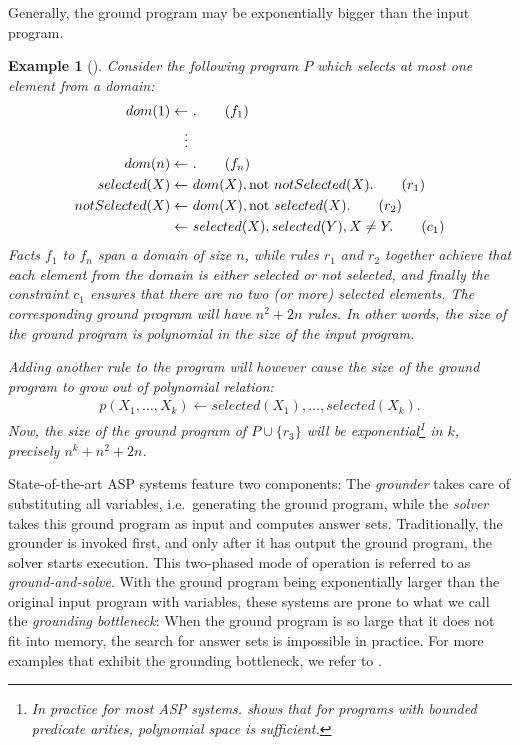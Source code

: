 \documentclass{vutinfth} %
\newtheorem{example}{Example}[chapter]
\newcommand{\fail}{\mathrm{not } \ \xspace}
\newcommand{\from}{\ensuremath{\leftarrow}}
\begin{document}
Generally, the ground program may be exponentially bigger than the input program.

\newpage

\begin{example}[{\cite[Example 1]{alpha-techniques}}]
\label{ex:explosion}
Consider the following program $P$ which selects at most one element from a domain:
\begin{align}
dom(1) \from& \ .\tag{$f_1$} \\
\vdots \notag \\
dom(n) \from& \ . \tag{$f_n$} \\
selected(X) \from& \  dom(X), \fail notSelected(X).  \tag{$r_1$} \\
notSelected(X) \from& \  dom(X), \fail selected(X).  \tag{$r_2$} \\
\from& \ selected(X), selected(Y), X \not = Y.  \tag{$c_1$}
\end{align}
Facts $f_1$ to $f_n$ span a domain of size $n$, while rules $r_1$ and $r_2$ together achieve that each element from the domain is either selected or not selected, and finally the constraint $c_1$ ensures that there are no two (or more) selected elements. The corresponding ground program will have $n^2 + 2n$ rules. In other words, the size of the ground program is polynomial in the size of the input program.

Adding another rule to the program will however cause the size of the ground program to grow out of polynomial relation:
\begin{align}p(X_1, \ldots, X_k) \from selected(X_1), \ldots, selected(X_k). \tag{$r_3$} \end{align}
Now, the size of the ground program of $P \cup \{ r_3 \}$ will be exponential\footnote{In practice for most ASP systems. \cite{bounded-arities} shows that for programs with bounded predicate arities, polynomial space is sufficient.} in $k$, precisely $n^k + n^2 + 2n$.
\end{example}

State-of-the-art ASP systems feature two components: The \emph{grounder} takes care of substituting all variables, i.e.~generating the ground program, while the \emph{solver} takes this ground program as input and computes answer sets. Traditionally, the grounder is invoked first, and only after it has output the ground program, the solver starts execution. This two-phased mode of operation is referred to as \emph{ground-and-solve}. With the ground program being exponentially larger than the original input program with variables, these systems are prone to what we call the \emph{grounding bottleneck}: When the ground program is so large that it does not fit into memory, the search for answer sets is impossible in practice. For more examples that exhibit the grounding bottleneck, we refer to \cite[Section 1]{asperix}.
\end{document}
